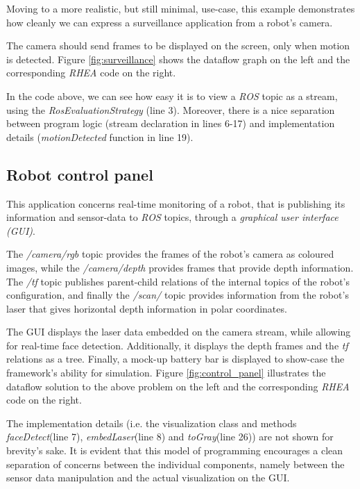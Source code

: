 \documentclass[sigplan,review,anonymous]{acmart}\settopmatter{printfolios=true}
\begin{document}
Moving to a more realistic, but still minimal, use-case, this example demonstrates how cleanly we can express a surveillance application from a robot's camera.

The camera should send frames to be displayed on the screen, only when motion is detected. Figure \ref{fig:surveillance} shows the dataflow graph on the left and the corresponding \textit{RHEA} code on the right.


In the code above, we can see how easy it is to view a \textit{ROS} topic as a stream, using the \textit{RosEvaluationStrategy} (line 3). Moreover, there is a nice separation between program logic (stream declaration in lines 6-17) and implementation details (\textit{motionDetected} function in line 19).

\subsection{Robot control panel}

This application concerns real-time monitoring of a robot, that is publishing its information and sensor-data to \textit{ROS} topics, through a \textit{graphical user interface (GUI)}.

The \textit{/camera/rgb} topic provides the frames of the robot's camera as coloured images, while the \textit{/camera/depth} provides frames that provide depth information. The \textit{/tf} topic publishes parent-child relations of the internal topics of the robot's configuration, and finally the \textit{/scan/} topic provides information from the robot's laser that gives horizontal depth information in polar coordinates.

The GUI displays the laser data embedded on the camera stream, while allowing for real-time face detection. Additionally, it displays the depth frames and the \textit{tf} relations as a tree. Finally, a mock-up battery bar is displayed to show-case the framework's ability for simulation. Figure \ref{fig:control_panel} illustrates the dataflow solution to the above problem on the left and the corresponding \textit{RHEA} code on the right.


The implementation details (i.e. the visualization class and methods \textit{faceDetect}(line 7), \textit{embedLaser}(line 8) and \textit{toGray}(line 26)) are not shown for brevity's sake. It is evident that this model of programming encourages a clean separation of concerns between the individual components, namely between the sensor data manipulation and the actual visualization on the GUI. 
\end{document}
